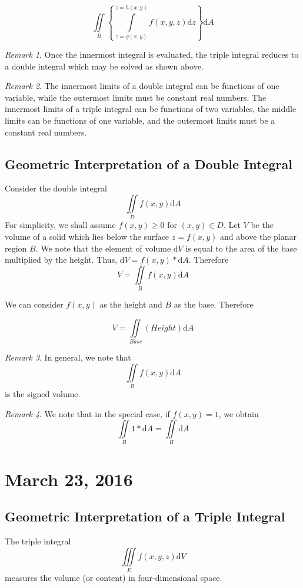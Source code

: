 \documentclass[11pt]{article}
\theoremstyle{plain} %
\theoremstyle{definition}
\theoremstyle{example}
\theoremstyle{remark}
\newtheorem*{remark}{Remark}
\begin{document}
$$\iint \limits_B \left\{\int\limits_{z=g(x, y)}^{z=h(x,y)} f(x, y, z) \mathrm d z\right\}\mathrm d A$$

\begin{remark}
Once the innermost integral is evaluated, the triple integral reduces to a double integral which may be solved as shown above.
\end{remark}

\begin{remark}
The innermost limits of a double integral can be functions of one variable, while the outermost limits must be constant real numbers. The innermost limits of a triple integral can be functions of two variables, the middle limits can be functions of one variable, and the outermost limits must be a constant real numbers. 
\end{remark}

\subsection{Geometric Interpretation of a Double Integral}

Consider the double integral $$\iint\limits_Df(x,y) \mathrm d A$$ For simplicity, we shall assume $f(x, y) \geq 0$ for $(x, y) \in  D$. Let $V$ be the volume of a solid which lies below the surface $z = f(x,y)$ and above the planar region $ B$. We note that the element of volume $\mathrm d V$ is equal to the area of the base multiplied by the height. Thus, $\mathrm d V = f(x,y)*\mathrm d A $. Therefore $$V = \iint\limits_Bf(x,y) \mathrm d A$$

We can consider $f(x,y)$ as the height and $ B$ as the base. Therefore

$$V = \iint\limits_{Base}(Height) \mathrm d A$$
\begin{remark}
In general, we note that $$\iint\limits_Bf(x,y) \mathrm d A$$ is the signed volume.
\end{remark}

\begin{remark}We note that in the special case, if $f(x, y) = 1$, we obtain $$\iint\limits_B1*\mathrm d A = \iint \limits_B \mathrm d A$$
\end{remark}

\section{March 23, 2016}

\subsection{Geometric Interpretation of a Triple Integral}
The triple integral $$\iiint\limits_E f(x, y, z)\mathrm d V$$  measures the volume (or content) in four-dimensional space.
\end{document}

